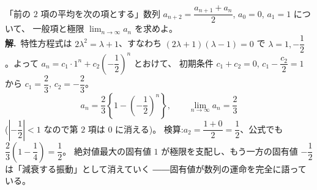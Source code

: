 \begin{rei}[例題・標準(極限をもつ数列)]\label{rei:power-limit}
「前の $2$ 項の平均を次の項とする」数列
$a_{n+2} = \dfrac{a_{n+1} + a_n}{2}$, $a_0 = 0$, $a_1 = 1$ について、
一般項と極限 $\displaystyle\lim_{n\to\infty} a_n$ を求めよ。\\
\textbf{解.}\ 特性方程式は $2\lambda^2 = \lambda + 1$、すなわち
$(2\lambda + 1)(\lambda - 1) = 0$ で
$\lambda = 1, -\dfrac{1}{2}$。よって
$a_n = c_1 \cdot 1^n + c_2\left(-\dfrac{1}{2}\right)^n$ とおけて、
初期条件 $c_1 + c_2 = 0$,
$c_1 - \dfrac{c_2}{2} = 1$ から $c_1 = \dfrac{2}{3}$,
$c_2 = -\dfrac{2}{3}$。
\[
a_n = \frac{2}{3}\left\{1 - \left(-\frac{1}{2}\right)^n\right\},
\qquad
\lim_{n\to\infty} a_n = \frac{2}{3}
\]
($\left|-\dfrac{1}{2}\right| < 1$ なので第 $2$ 項は $0$ に消える)。
検算:$a_2 = \dfrac{1 + 0}{2} = \dfrac{1}{2}$、公式でも
$\dfrac{2}{3}\left(1 - \dfrac{1}{4}\right) = \dfrac{1}{2}$。
絶対値最大の固有値 $1$ が極限を支配し、もう一方の固有値
$-\dfrac{1}{2}$ は「減衰する振動」として消えていく
――固有値が数列の運命を完全に語っている。
\end{rei}

